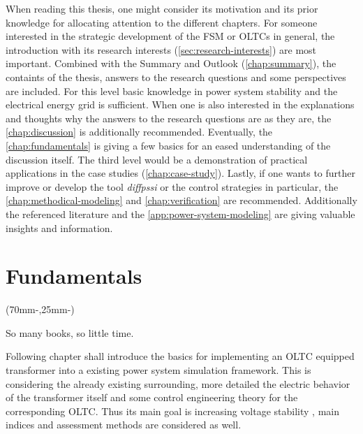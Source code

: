 When reading this thesis, one might consider its motivation and its prior knowledge for allocating attention to the different chapters.
For someone interested in the strategic development of the \acs{FSM} or \acsp{OLTC} in general, the introduction with its research interests (\autoref{sec:research-interests}) are most important. 
Combined with the Summary and Outlook (\autoref{chap:summary}), the containts of the thesis, answers to the research questions and some perspectives are included.
For this level basic knowledge in power system stability and the electrical energy grid is sufficient.
When one is also interested in the explanations and thoughts why the answers to the research questions are as they are, the  \autoref{chap:discussion} is additionally recommended. 
Eventually, the \autoref{chap:fundamentals} is giving a few basics for an eased understanding of the discussion itself.
The third level would be a demonstration of practical applications in the case studies (\autoref{chap:case-study}).
Lastly, if one wants to further improve or develop the tool {\itshape diffpssi} or the control strategies in particular, the \autoref{chap:methodical-modeling} and \autoref{chap:verification} are recommended.
Additionally the referenced literature and the \autoref{app:power-system-modeling} are giving valuable insights and information.

\chapter{Fundamentals}
\label{chap:fundamentals}

\begin{textblock*}{.7\textwidth}(70mm-\offset,25mm-\offset)
    \begin{fquote}
        So many books, so little time.
    \end{fquote}
\end{textblock*}

Following chapter shall introduce the basics for implementing an \acs{OLTC} equipped transformer into a existing power system simulation framework.
This is considering the already existing surrounding, more detailed the electric behavior of the transformer itself and some control engineering theory for the corresponding \acs{OLTC}. 
Thus its main goal is increasing voltage stability \autocite{machowski_2020}, main indices and assessment methods are considered as well.

